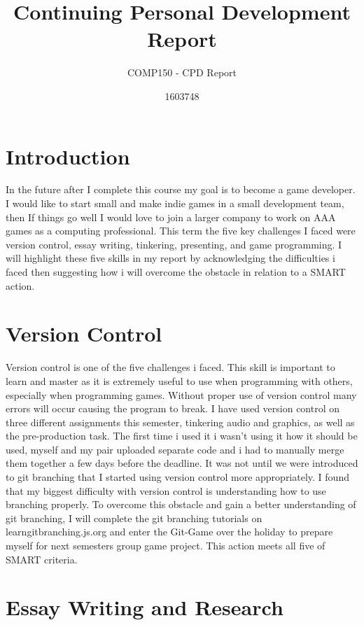 \documentclass{scrartcl}
\title{Continuing Personal Development Report}
\subtitle{COMP150 - CPD Report}
\author{1603748}
\begin{document}
\maketitle

\section{Introduction}

In the future after I complete this course my goal is to become a game developer. I would like to start small and make indie games in a small development team, then If things go well I would love to join a larger company to work on AAA games as a computing professional. This term the five key challenges I faced were version control, essay writing, tinkering, presenting, and game programming. I will highlight these five skills in my report by acknowledging the difficulties i faced then suggesting how i will overcome the obstacle in relation to a SMART action. 

\section{Version Control}

Version control is one of the five challenges i faced. This skill is important to learn and master as it is extremely useful to use when programming with others, especially when programming games. Without proper use of version control many errors will occur causing the program to break. I have used version control on three different assignments this semester, tinkering audio and graphics, as well as the pre-production task. The first time i used it i wasn't using it how it should be used, myself and my pair uploaded separate code and i had to manually merge them together a few days before the deadline. It was not until we were introduced to git branching that I started using version control more appropriately. I found that my biggest difficulty with version control is understanding how to use branching properly. To overcome this obstacle and gain a better understanding of git branching, I will complete the git branching tutorials on learngitbranching.js.org and enter the Git-Game over the holiday to prepare myself for next semesters group game project. This action meets all five of SMART criteria.

\section{Essay Writing and Research}
\end{document}
